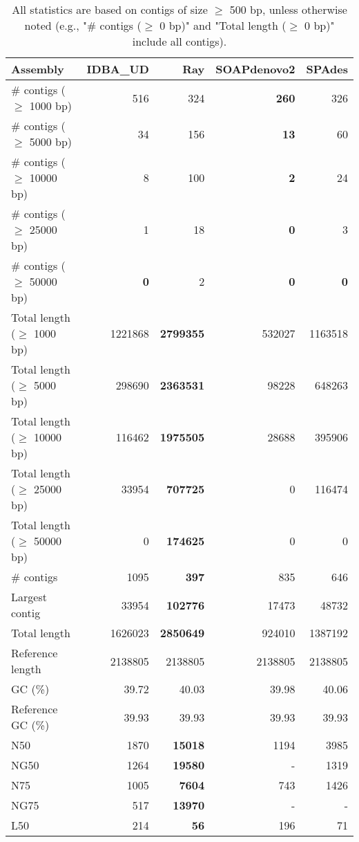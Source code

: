 \documentclass[12pt,a4paper]{article}
\begin{document}
\begin{table}[ht]
\begin{center}
\caption{All statistics are based on contigs of size $\geq$ 500 bp, unless otherwise noted (e.g., "\# contigs ($\geq$ 0 bp)" and "Total length ($\geq$ 0 bp)" include all contigs).}
\begin{tabular}{|l*{4}{|r}|}
\hline
Assembly & IDBA\_UD & Ray & SOAPdenovo2 & SPAdes \\ \hline
\# contigs ($\geq$ 1000 bp) & 516 & 324 & {\bf 260} & 326 \\ \hline
\# contigs ($\geq$ 5000 bp) & 34 & 156 & {\bf 13} & 60 \\ \hline
\# contigs ($\geq$ 10000 bp) & 8 & 100 & {\bf 2} & 24 \\ \hline
\# contigs ($\geq$ 25000 bp) & 1 & 18 & {\bf 0} & 3 \\ \hline
\# contigs ($\geq$ 50000 bp) & {\bf 0} & 2 & {\bf 0} & {\bf 0} \\ \hline
Total length ($\geq$ 1000 bp) & 1221868 & {\bf 2799355} & 532027 & 1163518 \\ \hline
Total length ($\geq$ 5000 bp) & 298690 & {\bf 2363531} & 98228 & 648263 \\ \hline
Total length ($\geq$ 10000 bp) & 116462 & {\bf 1975505} & 28688 & 395906 \\ \hline
Total length ($\geq$ 25000 bp) & 33954 & {\bf 707725} & 0 & 116474 \\ \hline
Total length ($\geq$ 50000 bp) & 0 & {\bf 174625} & 0 & 0 \\ \hline
\# contigs & 1095 & {\bf 397} & 835 & 646 \\ \hline
Largest contig & 33954 & {\bf 102776} & 17473 & 48732 \\ \hline
Total length & 1626023 & {\bf 2850649} & 924010 & 1387192 \\ \hline
Reference length & 2138805 & 2138805 & 2138805 & 2138805 \\ \hline
GC (\%) & 39.72 & 40.03 & 39.98 & 40.06 \\ \hline
Reference GC (\%) & 39.93 & 39.93 & 39.93 & 39.93 \\ \hline
N50 & 1870 & {\bf 15018} & 1194 & 3985 \\ \hline
NG50 & 1264 & {\bf 19580} & - & 1319 \\ \hline
N75 & 1005 & {\bf 7604} & 743 & 1426 \\ \hline
NG75 & 517 & {\bf 13970} & - & - \\ \hline
L50 & 214 & {\bf 56} & 196 & 71 \\ \hline

\end{tabular}
\end{center}
\end{table}
\end{document}
